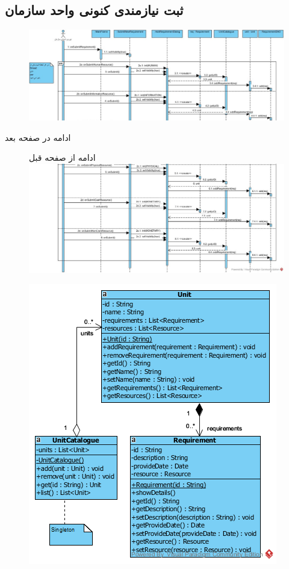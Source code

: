 \begin{landscape}
\section{ثبت نیازمندی کنونی واحد سازمان}
\begin{figure}[H]
	\centering
	\includegraphics[scale=0.7]{img/sequence-design/AddRequirementToUnit-1}
\end{figure}
ادامه در صفحه بعد \\
\begin{figure}[H]
ادامه از صفحه قبل \\
	\includegraphics[scale=0.7]{img/sequence-design/AddRequirementToUnit-2}
\end{figure}
\begin{figure}[H]
	\centering
	\includegraphics[scale=0.7]{img/sequence-design/AddRequirementToUnitC}

\end{figure}
\end{landscape}
